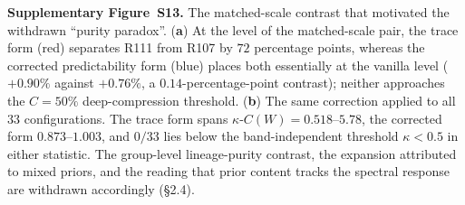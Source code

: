 \documentclass[11pt,a4paper]{article}
\begin{document}


\noindent\textbf{Supplementary Figure~S13.} The matched-scale contrast that motivated the withdrawn ``purity paradox''. (\textbf{a}) At the level of the matched-scale pair, the trace form (red) separates R111 from R107 by $72$ percentage points, whereas the corrected predictability form (blue) places both essentially at the vanilla level ($+0.90\%$ against $+0.76\%$, a $0.14$-percentage-point contrast); neither approaches the $C=50\%$ deep-compression threshold. (\textbf{b}) The same correction applied to all $33$ configurations. The trace form spans $\kappa$-$C(W)=0.518$--$5.78$, the corrected form $0.873$--$1.003$, and $0/33$ lies below the band-independent threshold $\kappa<0.5$ in either statistic. The group-level lineage-purity contrast, the expansion attributed to mixed priors, and the reading that prior content tracks the spectral response are withdrawn accordingly (\S2.4).

\clearpage




\end{document}
